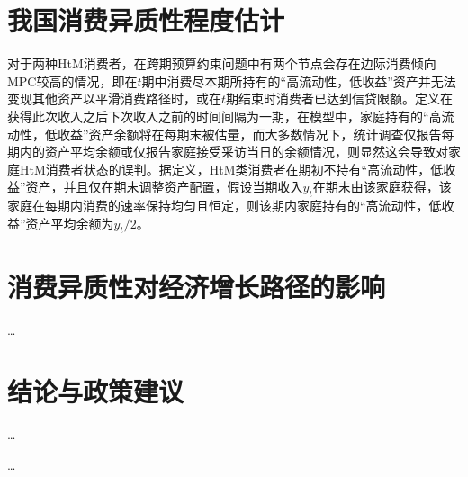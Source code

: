 \documentclass[supercite]{HustGraduPaper}
\begin{document}
    \section{我国消费异质性程度估计}
    对于两种HtM消费者，在跨期预算约束问题中有两个节点会存在边际消费倾向MPC较高的情况，即在$t$期中消费尽本期所持有的“高流动性，低收益”资产并无法变现其他资产以平滑消费路径时，或在$t$期结束时消费者已达到信贷限额。定义在获得此次收入之后下次收入之前的时间间隔为一期，在模型中，家庭持有的“高流动性，低收益”资产余额将在每期末被估量，而大多数情况下，统计调查仅报告每期内的资产平均余额或仅报告家庭接受采访当日的余额情况，则显然这会导致对家庭HtM消费者状态的误判。据定义，HtM类消费者在期初不持有“高流动性，低收益”资产，并且仅在期末调整资产配置，假设当期收入$y_t$在期末由该家庭获得，该家庭在每期内消费的速率保持均匀且恒定，则该期内家庭持有的“高流动性，低收益”资产平均余额为$y_t/2$。
    
    \section{消费异质性对经济增长路径的影响}
    \ldots
    
    \section{结论与政策建议}
    \ldots
    
    \begin{thankpage}
    \ldots
    \end{thankpage}

    
    
\end{document}
